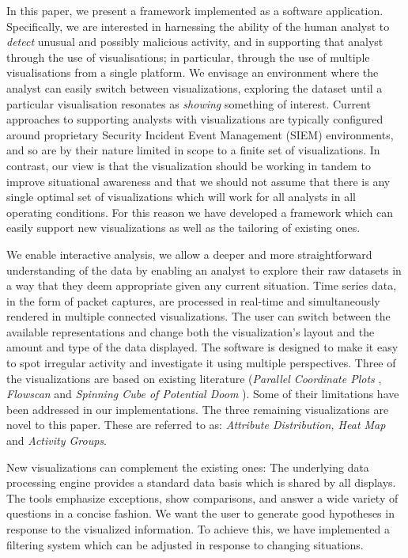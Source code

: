 In this paper, we present a framework implemented as a software application. Specifically, we are
interested in harnessing the ability of the human analyst to \textit{detect} unusual and possibly
malicious activity, and in supporting that analyst through the use of visualisations; in particular,
through the use of multiple visualisations from a single platform. We envisage an environment where
the analyst can easily switch between visualizations, exploring the dataset until a particular
visualisation resonates as \textit{showing} something of interest. Current approaches to supporting
analysts with visualizations are typically configured around proprietary Security Incident Event
Management (SIEM) environments, and so are by their nature limited in scope to a finite set of
visualizations. In contrast, our view is that the visualization should be working in tandem to
improve situational awareness and that we should not assume that there is any single optimal set of
visualizations which will work for all analysts in all operating conditions. For this reason we have
developed a framework which can easily support new visualizations as well as the tailoring of
existing ones.

We enable interactive analysis, we allow a deeper and more straightforward understanding of the data
by enabling an analyst to explore their raw datasets in a way that they deem appropriate given any
current situation. Time series data, in the form of packet captures, are processed in real-time and
simultaneously rendered in multiple connected visualizations. The user can switch between the
available representations and change both the visualization's layout and the amount and
type of the data displayed. The software is designed to make it easy to spot irregular
activity and investigate it using multiple perspectives. Three of the visualizations are based on
existing literature (\textit{Parallel Coordinate Plots} \cite{inselberg1985plane}, \textit{Flowscan}
\cite{plonka2000flowscan} and \textit{Spinning Cube of Potential Doom} \cite{lau2004spinning}). Some
of their limitations have been addressed in our implementations. The three remaining visualizations
are novel to this paper. These are referred to as: \textit{Attribute Distribution, Heat Map} and
\textit{Activity Groups}.

New visualizations can complement the existing ones: The underlying data processing engine provides a standard data basis which is shared by all displays. The tools emphasize exceptions, show comparisons, and answer a wide variety of questions in a concise fashion. We want the user to generate good hypotheses in response to the visualized information. To achieve this, we have implemented a filtering system which can be adjusted in response to changing situations. 

